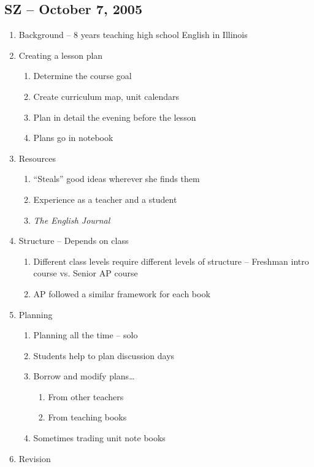 \subsection{SZ -- October 7, 2005}
\begin{enumerate}
	\item Background -- 8 years teaching high school English in Illinois
	\item Creating a lesson plan
		\begin{enumerate}
			\item Determine the course goal
			\item Create curriculum map, unit calendars
			\item Plan in detail the evening before the lesson
			\item Plans go in notebook
		\end{enumerate}
	\item Resources
		\begin{enumerate}
			\item ``Steals'' good ideas wherever she finds them
			\item Experience as a teacher and a student
			\item \textit{The English Journal}
		\end{enumerate}
	\item Structure -- Depends on class
		\begin{enumerate}
			\item Different class levels require different levels of structure
				-- Freshman intro course vs. Senior AP course
			\item AP followed a similar framework for each book
		\end{enumerate}
	\item Planning
		\begin{enumerate}
			\item Planning all the time -- solo
			\item Students help to plan discussion days
			\item Borrow and modify plans\ldots
				\begin{enumerate}
					\item From other teachers
					\item From teaching books
				\end{enumerate}
			\item Sometimes trading unit note books
		\end{enumerate}
	\item Revision
		\begin{enumerate}

\end{enumerate}
\end{enumerate}
